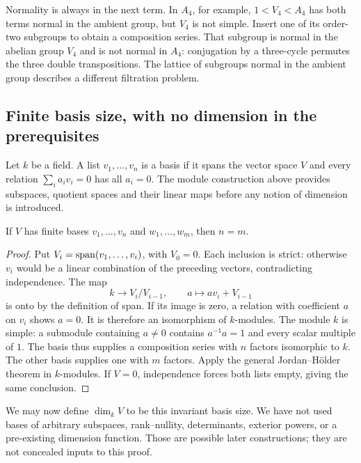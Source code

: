 Normality is always in the next term. In $A_4$, for example,
$1<V_4<A_4$ has both terms normal in the ambient group, but $V_4$ is not
simple. Insert one of its order-two subgroups to obtain a composition series.
That subgroup is normal in the abelian group $V_4$ and is not normal in
$A_4$: conjugation by a three-cycle permutes the three double transpositions.
The lattice of subgroups normal in the ambient group describes a different
filtration problem.

\subsection{Finite basis size, with no dimension in the prerequisites}
\label{e:dimension}

Let $k$ be a field. A list $v_1,\ldots,v_n$ is a basis if it spans the vector
space $V$ and every relation $\sum_i a_i v_i=0$ has all $a_i=0$.
The module construction above provides subspaces, quotient spaces and their
linear maps before any notion of dimension is introduced.

\begin{theorem}\label{e:dimension-theorem}
If $V$ has finite bases $v_1,\ldots,v_n$ and $w_1,\ldots,w_m$, then $n=m$.
\end{theorem}
\begin{proof}
Put $V_i=\operatorname{span}(v_1,\ldots,v_i)$, with $V_0=0$. Each inclusion is strict:
otherwise $v_i$ would be a linear combination of the preceding vectors,
contradicting independence. The map
\[
k\longrightarrow V_i/V_{i-1},\qquad a\longmapsto av_i+V_{i-1}
\]
is onto by the definition of span. If its image is zero, a relation with
coefficient $a$ on $v_i$ shows $a=0$. It is therefore an isomorphism of
$k$-modules. The module $k$ is simple: a submodule containing $a\ne0$
contains $a^{-1}a=1$ and every scalar multiple of $1$.
The basis thus supplies a composition series with $n$ factors isomorphic
to $k$. The other basis supplies one with $m$ factors. Apply the general
Jordan--H\"older theorem in $k$-modules. If $V=0$, independence forces
both lists empty, giving the same conclusion.
\end{proof}

We may now define $\dim_k V$ to be this invariant basis size. We have not
used bases of arbitrary subspaces, rank--nullity, determinants, exterior
powers, or a pre-existing dimension function. Those are possible later
constructions; they are not concealed inputs to this proof.


